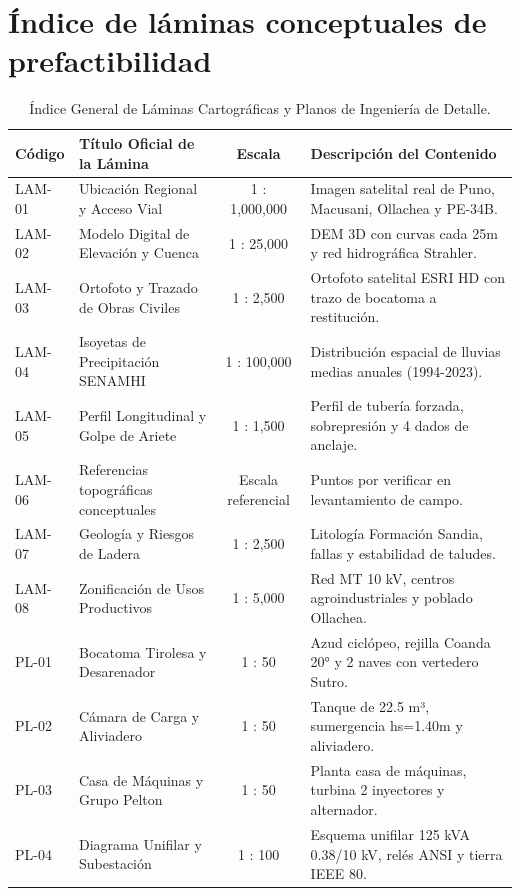 \documentclass[11pt,a4paper]{report}
\begin{document}
\section{Índice de láminas conceptuales de prefactibilidad}
\begin{table}[H]
\centering
\small
\begin{tabularx}{\linewidth}{llcX}
\toprule
\textbf{Código} & \textbf{Título Oficial de la Lámina} & \textbf{Escala} & \textbf{Descripción del Contenido} \\
\midrule
LAM-01 & Ubicación Regional y Acceso Vial & 1 : 1,000,000 & Imagen satelital real de Puno, Macusani, Ollachea y PE-34B. \\
LAM-02 & Modelo Digital de Elevación y Cuenca & 1 : 25,000 & DEM 3D con curvas cada 25m y red hidrográfica Strahler. \\
LAM-03 & Ortofoto y Trazado de Obras Civiles & 1 : 2,500 & Ortofoto satelital ESRI HD con trazo de bocatoma a restitución. \\
LAM-04 & Isoyetas de Precipitación SENAMHI & 1 : 100,000 & Distribución espacial de lluvias medias anuales (1994-2023). \\
LAM-05 & Perfil Longitudinal y Golpe de Ariete & 1 : 1,500 & Perfil de tubería forzada, sobrepresión y 4 dados de anclaje. \\
LAM-06 & Referencias topográficas conceptuales & Escala referencial & Puntos por verificar en levantamiento de campo. \\
LAM-07 & Geología y Riesgos de Ladera & 1 : 2,500 & Litología Formación Sandia, fallas y estabilidad de taludes. \\
LAM-08 & Zonificación de Usos Productivos & 1 : 5,000 & Red MT 10 kV, centros agroindustriales y poblado Ollachea. \\
PL-01 & Bocatoma Tirolesa y Desarenador & 1 : 50 & Azud ciclópeo, rejilla Coanda 20° y 2 naves con vertedero Sutro. \\
PL-02 & Cámara de Carga y Aliviadero & 1 : 50 & Tanque de 22.5 m³, sumergencia hs=1.40m y aliviadero. \\
PL-03 & Casa de Máquinas y Grupo Pelton & 1 : 50 & Planta casa de máquinas, turbina 2 inyectores y alternador. \\
PL-04 & Diagrama Unifilar y Subestación & 1 : 100 & Esquema unifilar 125 kVA 0.38/10 kV, relés ANSI y tierra IEEE 80. \\
\bottomrule
\end{tabularx}
\caption{Índice General de Láminas Cartográficas y Planos de Ingeniería de Detalle.}
\label{tab:catalogo_laminas}
\end{table}
\end{document}
